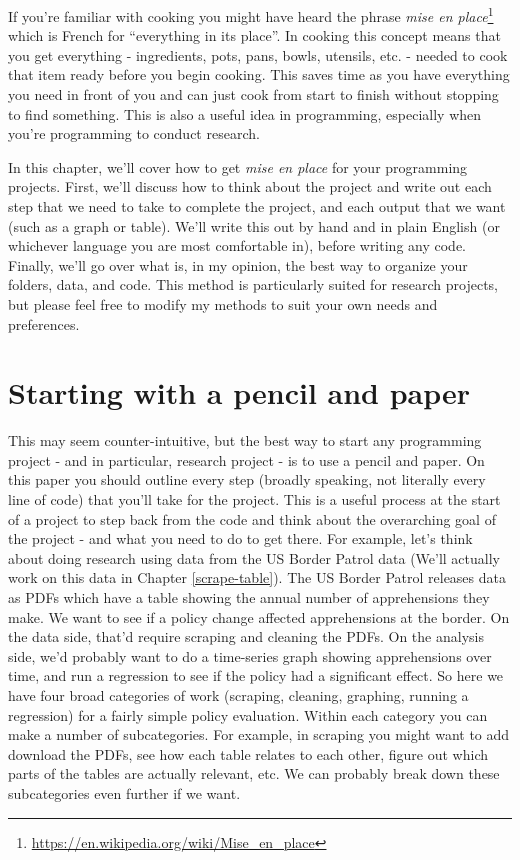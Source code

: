 \documentclass[
]{krantz}
\renewcommand{\href}[2]{#2\footnote{\url{#1}}}
\begin{document}
If you're familiar with cooking you might have heard the
phrase
\href{https://en.wikipedia.org/wiki/Mise_en_place}{\emph{mise
en place}} which is French for ``everything in its place''.
In cooking this concept means that you get everything -
ingredients, pots, pans, bowls, utensils, etc. - needed to
cook that item ready before you begin cooking. This saves
time as you have everything you need in front of you and can
just cook from start to finish without stopping to find
something. This is also a useful idea in programming,
especially when you're programming to conduct research.

In this chapter, we'll cover how to get \emph{mise en place}
for your programming projects. First, we'll discuss how to
think about the project and write out each step that we need
to take to complete the project, and each output that we
want (such as a graph or table). We'll write this out by
hand and in plain English (or whichever language you are
most comfortable in), before writing any code. Finally,
we'll go over what is, in my opinion, the best way to
organize your folders, data, and code. This method is
particularly suited for research projects, but please feel
free to modify my methods to suit your own needs and
preferences.

\hypertarget{starting-with-a-pencil-and-paper}{%
\section{Starting with a pencil and
paper}\label{starting-with-a-pencil-and-paper}}

This may seem counter-intuitive, but the best way to start
any programming project - and in particular, research
project - is to use a pencil and paper. On this paper you
should outline every step (broadly speaking, not literally
every line of code) that you'll take for the project. This
is a useful process at the start of a project to step back
from the code and think about the overarching goal of the
project - and what you need to do to get there. For example,
let's think about doing research using data from the US
Border Patrol data (We'll actually work on this data in
Chapter \ref{scrape-table}). The US Border Patrol releases
data as PDFs which have a table showing the annual number of
apprehensions they make. We want to see if a policy change
affected apprehensions at the border. On the data side,
that'd require scraping and cleaning the PDFs. On the
analysis side, we'd probably want to do a time-series graph
showing apprehensions over time, and run a regression to see
if the policy had a significant effect. So here we have four
broad categories of work (scraping, cleaning, graphing,
running a regression) for a fairly simple policy evaluation.
Within each category you can make a number of subcategories.
For example, in scraping you might want to add download the
PDFs, see how each table relates to each other, figure out
which parts of the tables are actually relevant, etc. We can
probably break down these subcategories even further if we
want.
\end{document}
